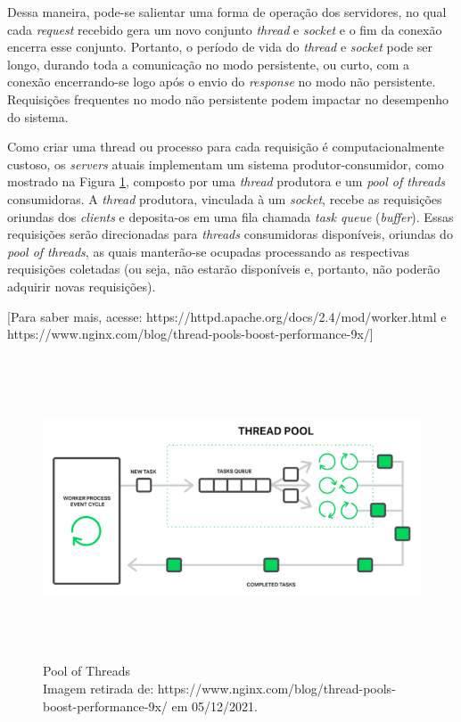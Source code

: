 Dessa maneira, pode-se salientar uma forma de operação dos servidores,
no qual cada \emph{request} recebido gera um novo conjunto \emph{thread}
e \emph{socket} e o fim da conexão encerra esse conjunto. Portanto, o
período de vida do \emph{thread} e \emph{socket} pode ser longo, durando
toda a comunicação no modo persistente, ou curto, com a conexão
encerrando-se logo após o envio do \emph{response} no modo não
persistente. Requisições frequentes no modo não persistente podem
impactar no desempenho do sistema.

Como criar uma thread ou processo para cada requisição é
computacionalmente custoso, os \emph{servers} atuais implementam um
sistema produtor-consumidor, como mostrado na Figura \ref{Pool of Threads}, composto por
uma \emph{thread} produtora e um \emph{pool of threads} consumidoras. A
\emph{thread} produtora, vinculada à um \emph{socket}, recebe as
requisições oriundas dos \emph{clients} e deposita-os em uma fila
chamada \emph{task queue} (\emph{buffer}). Essas requisições serão
direcionadas para \emph{threads} consumidoras disponíveis, oriundas do
\emph{pool of threads}, as quais manterão-se ocupadas processando as
respectivas requisições coletadas (ou seja, não estarão disponíveis e,
portanto, não poderão adquirir novas requisições).

{[}Para saber mais, acesse:
https://httpd.apache.org/docs/2.4/mod/worker.html e
https://www.nginx.com/blog/thread-pools-boost-performance-9x/{]}


\begin{figure}[h!]
\centering
\includegraphics[keepaspectratio, width=12cm, height=9cm]{imagens/11/11 - pool of threads.png}
\caption{Pool of Threads \\
Imagem retirada de:
https://www.nginx.com/blog/thread-pools-boost-performance-9x/ em
05/12/2021. \\}
\label{Pool of Threads}
\end{figure}


